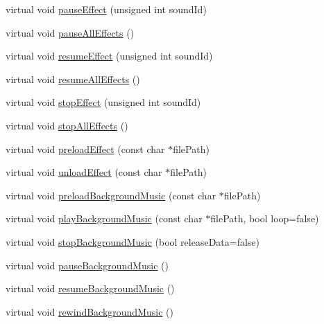 \begin{DoxyCompactItemize}
\item 
virtual void \hyperlink{classCocosDenshion_1_1SimpleAudioEngine_a44346159dae470e131ea1046aca63937}{pause\+Effect} (unsigned int sound\+Id)
\item 
virtual void \hyperlink{classCocosDenshion_1_1SimpleAudioEngine_a50ce3f003c8028e4e2c23e36db89d362}{pause\+All\+Effects} ()
\item 
virtual void \hyperlink{classCocosDenshion_1_1SimpleAudioEngine_a326bb76e2cc33a22629ac794345e7b18}{resume\+Effect} (unsigned int sound\+Id)
\item 
virtual void \hyperlink{classCocosDenshion_1_1SimpleAudioEngine_a502d7f9edde68126ebe1ecd9d29357e4}{resume\+All\+Effects} ()
\item 
virtual void \hyperlink{classCocosDenshion_1_1SimpleAudioEngine_a118f6e08368f543957356a7da8ad8f71}{stop\+Effect} (unsigned int sound\+Id)
\item 
virtual void \hyperlink{classCocosDenshion_1_1SimpleAudioEngine_a41cac6b6201c29a06ce18e52191520de}{stop\+All\+Effects} ()
\item 
virtual void \hyperlink{classCocosDenshion_1_1SimpleAudioEngine_ab4c7a383c668003d48094a3ed867a778}{preload\+Effect} (const char $\ast$file\+Path)
\item 
virtual void \hyperlink{classCocosDenshion_1_1SimpleAudioEngine_ad370e42405e90a0701fe9ee63d29c8e1}{unload\+Effect} (const char $\ast$file\+Path)
\item 
virtual void \hyperlink{classCocosDenshion_1_1SimpleAudioEngine_aef5c525d1003459cf339053ec3101a24}{preload\+Background\+Music} (const char $\ast$file\+Path)
\item 
virtual void \hyperlink{classCocosDenshion_1_1SimpleAudioEngine_a1b61a76779b623c1534839146f8a5483}{play\+Background\+Music} (const char $\ast$file\+Path, bool loop=false)
\item 
virtual void \hyperlink{classCocosDenshion_1_1SimpleAudioEngine_ad922d9d678ab53e92509d2dc7c1ea0f2}{stop\+Background\+Music} (bool release\+Data=false)
\item 
virtual void \hyperlink{classCocosDenshion_1_1SimpleAudioEngine_ab85ae442b45e99bc58bfdbb3a4f66d52}{pause\+Background\+Music} ()
\item 
virtual void \hyperlink{classCocosDenshion_1_1SimpleAudioEngine_a0be1b6e565d0812fddd6a0ab23fadd60}{resume\+Background\+Music} ()
\item 
virtual void \hyperlink{classCocosDenshion_1_1SimpleAudioEngine_a326582ffb6fe413f2b5dc0d5878699ff}{rewind\+Background\+Music} ()

\end{DoxyCompactItemize}
